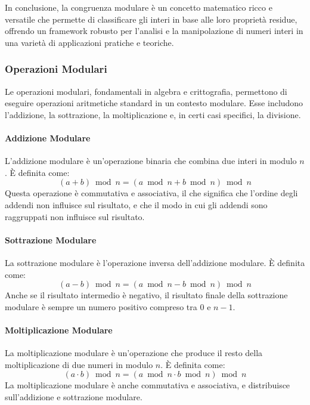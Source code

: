 \documentclass{article}
\theoremstyle{definition}
\begin{document}
In conclusione, la congruenza modulare è un concetto matematico ricco e versatile che permette di classificare gli interi in base alle loro proprietà residue, offrendo un framework robusto per l'analisi e la manipolazione di numeri interi in una varietà di applicazioni pratiche e teoriche.

\subsubsection{Operazioni Modulari}
Le operazioni modulari, fondamentali in algebra e crittografia, permettono di eseguire operazioni aritmetiche standard in un contesto modulare. Esse includono l'addizione, la sottrazione, la moltiplicazione e, in certi casi specifici, la divisione.

\paragraph{Addizione Modulare}
L'addizione modulare è un'operazione binaria che combina due interi in modulo $n$.
È definita come:
\begin{equation*}
    (a + b) \bmod n = (a \bmod n + b \bmod n) \bmod n
\end{equation*}
Questa operazione è commutativa e associativa, il che significa che l'ordine degli addendi non influisce sul risultato, e che il modo in cui gli addendi sono raggruppati non influisce sul risultato.

\paragraph{Sottrazione Modulare}
La sottrazione modulare è l'operazione inversa dell'addizione modulare. È definita come:
\begin{equation*}
    (a - b) \bmod n = (a \bmod n - b \bmod n) \bmod n
\end{equation*}
Anche se il risultato intermedio è negativo, il risultato finale della sottrazione modulare è sempre un numero positivo compreso tra $0$ e $n-1$.

\paragraph{Moltiplicazione Modulare}
La moltiplicazione modulare è un'operazione che produce il resto della moltiplicazione di due numeri in modulo $n$. È definita come:
\begin{equation*}
    (a \cdot b) \bmod n = (a \bmod n \cdot b \bmod n) \bmod n
\end{equation*}
La moltiplicazione modulare è anche commutativa e associativa, e distribuisce sull'addizione e sottrazione modulare.
\end{document}
